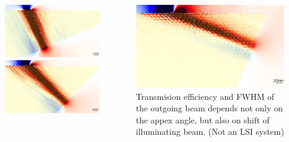 \documentclass{beamer}
\begin{document}
\begin{frame}[t]
	\begin{columns}
		\begin{column}{0.5\textwidth}
			\begin{figure}[htb]
				\includegraphics[width=\textwidth]{../images/multilayer/prism04.png} \\
				\includegraphics[width=\textwidth]{../images/multilayer/prism08.png} \\
			\end{figure}
		\end{column}
		\begin{column}{0.5\textwidth}
				\includegraphics[width=\textwidth]{../images/multilayer/prism12.png}\\
				Transmision efficiency and FWHM of the outgoing beam depends not only on the appex angle, but also on shift of illuminating beam. (Not an LSI system)
	

\end{column}
\end{columns}
\end{frame}
\end{document}
